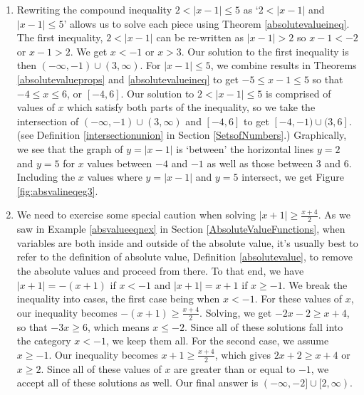 {\begin{enumerate}
\item  Rewriting the compound inequality  $2 < |x-1| \leq 5$ as `$2 < |x-1|$ and $|x-1| \leq 5$' allows us to solve each piece using Theorem \ref{absolutevalueineq}.  The first inequality, $2 < |x-1|$ can be re-written as $|x-1|>2$ so $x-1 < -2$ or $x-1 > 2$.  We get $x<-1$ or $x>3$.  Our solution to the first inequality is then $(-\infty, -1) \cup (3, \infty)$.  For $|x-1| \leq 5$, we combine results in Theorems \ref{absolutevalueprops} and \ref{absolutevalueineq} to get $-5 \leq x-1 \leq 5$ so that $-4 \leq x \leq 6$, or $[-4,6]$.  Our solution to   $2 < |x-1| \leq 5$ is comprised of values of $x$ which satisfy both parts of the inequality, so we take the intersection  of $(-\infty, -1) \cup (3, \infty)$ and $[-4,6]$ to get  $[-4,-1) \cup (3,6]$.  (see Definition \ref{intersectionunion} in Section \ref{SetsofNumbers}.) Graphically, we see that the graph of $y=|x-1|$ is `between' the horizontal lines $y=2$ and $y=5$ for $x$ values between $-4$ and $-1$ as well as those between $3$ and $6$.  Including the $x$ values where $y=|x-1|$ and $y=5$ intersect, we get Figure \ref{fig:absvalineqeg3}.



\item  We need to exercise some special caution when solving $|x+1|\geq \frac{x+4}{2}$.  As we saw in Example \ref{absvalueeqnex} in Section \ref{AbsoluteValueFunctions},  when variables are both inside and outside of the absolute value, it's usually best to refer to the definition of absolute value, Definition \ref{absolutevalue}, to remove the absolute values and proceed from there.  To that end, we have $|x+1| = -(x+1)$ if $x < -1$ and $|x+1| = x+1$ if $x \geq -1$.  We break the inequality into cases, the first case being when $x<-1$.  For these values of $x$, our inequality becomes $-(x+1) \geq \frac{x+4}{2}$.  Solving, we get $-2x-2 \geq x+4$, so that $-3x \geq 6$, which means $x \leq -2$.  Since all of these solutions fall into the category $x < -1$, we keep them all.  For the second case, we assume $x \geq -1$. Our inequality becomes $x+1 \geq \frac{x+4}{2}$, which gives $2x+2 \geq x+4$ or $x \geq 2$.  Since all of these values of $x$ are greater than or equal to $-1$, we accept all of  these solutions as well.  Our final answer is  $(-\infty, -2] \cup [2,\infty)$.

\end{enumerate}
}


